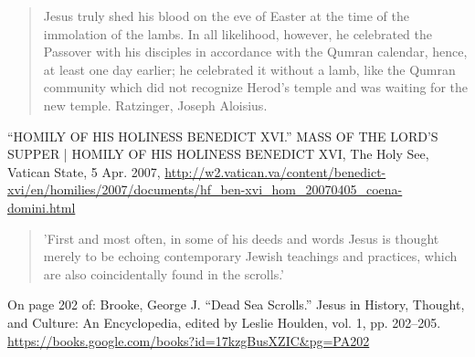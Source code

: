 \documentclass[11pt]{article}
\begin{document}
\begin{thebibliography}{37}
\begin{quote}
Jesus truly shed his blood on the eve of Easter at the time of the immolation of the lambs. 
In all likelihood, however, he celebrated the Passover with his disciples in accordance with the Qumran calendar, hence, at least one day earlier; he celebrated it without a lamb, like the Qumran community which did not recognize Herod's temple and was waiting for the new temple.
Ratzinger, Joseph Aloisius. 
\end{quote}
“HOMILY OF HIS HOLINESS BENEDICT XVI.” MASS OF THE LORD'S SUPPER | HOMILY OF HIS HOLINESS BENEDICT XVI, The Holy See, Vatican State, 5 Apr. 2007, \url{http://w2.vatican.va/content/benedict-xvi/en/homilies/2007/documents/hf_ben-xvi_hom_20070405_coena-domini.html}

\begin{quote}
'First and most often, in some of his deeds and words Jesus is thought merely to be echoing contemporary Jewish teachings and practices, which are also coincidentally found in the scrolls.'
\end{quote}
On page 202 of:
Brooke, George J. “Dead Sea Scrolls.” Jesus in History, Thought, and Culture: An Encyclopedia, edited by Leslie Houlden, vol. 1, pp. 202–205. \url{https://books.google.com/books?id=17kzgBusXZIC&pg=PA202}


\end{thebibliography}
\end{document}
